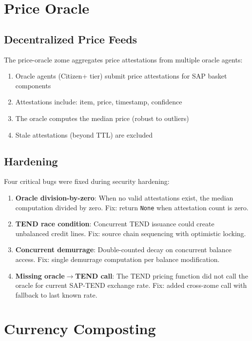 \documentclass[11pt,twocolumn]{article}
\begin{document}
\section{Price Oracle}

\subsection{Decentralized Price Feeds}

The price-oracle zome aggregates price attestations from multiple oracle agents:

\begin{enumerate}[nosep]
  \item Oracle agents (Citizen+ tier) submit price attestations for SAP basket
    components
  \item Attestations include: item, price, timestamp, confidence
  \item The oracle computes the median price (robust to outliers)
  \item Stale attestations (beyond TTL) are excluded
\end{enumerate}

\subsection{Hardening}

Four critical bugs were fixed during security hardening:

\begin{enumerate}[nosep]
  \item \textbf{Oracle division-by-zero}: When no valid attestations exist,
    the median computation divided by zero. Fix: return \texttt{None} when
    attestation count is zero.
  \item \textbf{TEND race condition}: Concurrent TEND issuance could create
    unbalanced credit lines. Fix: source chain sequencing with optimistic
    locking.
  \item \textbf{Concurrent demurrage}: Double-counted decay on concurrent
    balance access. Fix: single demurrage computation per balance modification.
  \item \textbf{Missing oracle$\to$TEND call}: The TEND pricing function
    did not call the oracle for current SAP-TEND exchange rate. Fix: added
    cross-zome call with fallback to last known rate.
\end{enumerate}

\section{Currency Composting}
\end{document}
